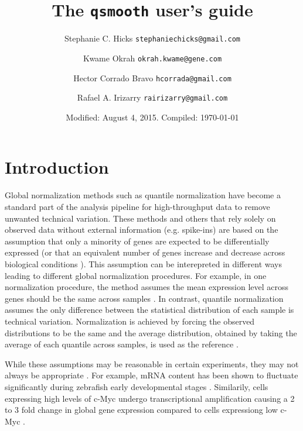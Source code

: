 \documentclass{article}\usepackage[]{graphicx}\usepackage[usenames,dvipsnames]{color}
\title{The \texttt{qsmooth} user's guide}
\author{Stephanie C. Hicks \texttt{stephaniechicks@gmail.com} \and
Kwame Okrah \texttt{okrah.kwame@gene.com} \and
Hector Corrado Bravo \texttt{hcorrada@gmail.com} \and
Rafael A. Irizarry \texttt{rairizarry@gmail.com} }
\date{Modified: August 4, 2015.  Compiled: \today}
\begin{document}
\maketitle
 
\tableofcontents

\section{Introduction}

Global normalization methods such as quantile normalization 
\cite{Bolstad2003, Irizarry2003} have become a standard part of the
analysis pipeline for high-throughput data to remove unwanted 
technical variation. These methods and others that rely solely 
on observed data without external information (e.g. spike-ins)
are based on the assumption that only a minority of genes are 
expected to be differentially expressed (or that an equivalent 
number of genes increase and decrease across biological conditions
\cite{aanes2014normalization}). This assumption can be interepreted
in different ways leading to different global normalization 
procedures. For example, in one normalization procedure, the method assumes
the mean expression level across genes should be the same across samples
\cite{Robinson2010}. In contrast, quantile normalization assumes the 
only difference between the statistical distribution of each sample
is technical variation. Normalization is achieved by forcing the 
observed distributions to be the same and the average distribution, 
obtained by taking the average of each quantile across samples,
is used as the reference \cite{Bolstad2003}.

While these assumptions may be reasonable in certain experiments,
they may not always be appropriate \cite{Loven2012, Hicks2015}.
For example, mRNA content has been shown to fluctuate significantly
during zebrafish early developmental stages \cite{aanes2014normalization}.
Similarily, cells expressing high levels of c-Myc undergo
transcriptional amplification causing a 2 to 3 fold change in global
gene expression compared to cells expressiong low c-Myc
\cite{Loven2012}. 
\end{document}
